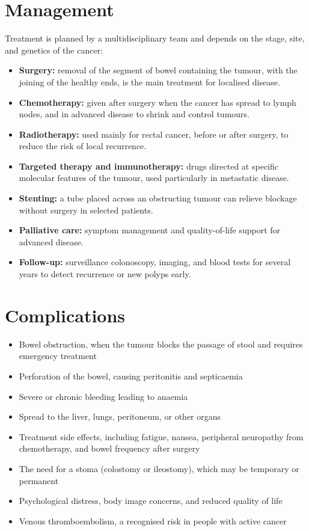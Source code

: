 \section*{Management}
Treatment is planned by a multidisciplinary team and depends on the stage, site, and genetics of the cancer:
\begin{itemize}
    \item \textbf{Surgery:} removal of the segment of bowel containing the tumour, with the joining of the healthy ends, is the main treatment for localised disease.
    \item \textbf{Chemotherapy:} given after surgery when the cancer has spread to lymph nodes, and in advanced disease to shrink and control tumours.
    \item \textbf{Radiotherapy:} used mainly for rectal cancer, before or after surgery, to reduce the risk of local recurrence.
    \item \textbf{Targeted therapy and immunotherapy:} drugs directed at specific molecular features of the tumour, used particularly in metastatic disease.
    \item \textbf{Stenting:} a tube placed across an obstructing tumour can relieve blockage without surgery in selected patients.
    \item \textbf{Palliative care:} symptom management and quality-of-life support for advanced disease.
    \item \textbf{Follow-up:} surveillance colonoscopy, imaging, and blood tests for several years to detect recurrence or new polyps early.
\end{itemize}

\section*{Complications}
\begin{itemize}
    \item Bowel obstruction, when the tumour blocks the passage of stool and requires emergency treatment
    \item Perforation of the bowel, causing peritonitis and septicaemia
    \item Severe or chronic bleeding leading to anaemia
    \item Spread to the liver, lungs, peritoneum, or other organs
    \item Treatment side effects, including fatigue, nausea, peripheral neuropathy from chemotherapy, and bowel frequency after surgery
    \item The need for a stoma (colostomy or ileostomy), which may be temporary or permanent
    \item Psychological distress, body image concerns, and reduced quality of life
    \item Venous thromboembolism, a recognised risk in people with active cancer
\end{itemize}

